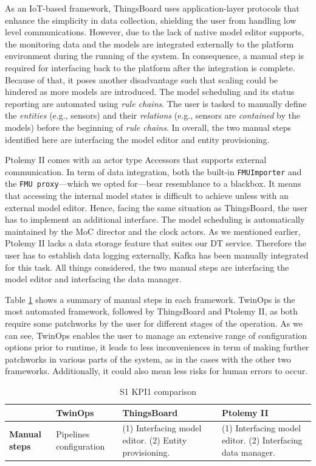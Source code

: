 As an IoT-based framework, ThingsBoard uses application-layer protocols that enhance the simplicity in data collection, shielding the user from handling low level communications. However, due to the lack of native model editor supports, the monitoring data and the models are integrated externally to the platform environment during the running of the system. In consequence, a manual step is required for interfacing back to the platform after the integration is complete. Because of that, it poses another disadvantage such that scaling could be hindered as more models are introduced. The model scheduling and its status reporting are automated using \textit{rule chains}. The user is tasked to manually define the \textit{entities} (e.g., sensors) and their \textit{relations} (e.g., sensors are \textit{contained} by the models) before the beginning of \textit{rule chains}. In overall, the two manual steps identified here are interfacing the model editor and entity provisioning. 

Ptolemy II comes with an actor type Accessors that supports external communication. In term of data integration, both the built-in \texttt{FMUImporter} and the \texttt{FMU proxy}---which we opted for---bear resemblance to a blackbox. It means that accessing the internal model states is difficult to achieve unless with an external model editor. Hence, facing the same situation as ThingsBoard, the user has to implement an additional interface. The model scheduling is automatically maintained by the MoC director and the clock actors. As we mentioned earlier, Ptolemy II lacks a data storage feature that suites our DT service. Therefore the user has to establish data logging externally, Kafka has been manually integrated for this task. All things considered, the two manual steps are interfacing the model editor and interfacing the data manager.

Table \ref{tab:kpi1compare} shows a summary of manual steps in each framework. TwinOps is the most automated framework, followed by ThingsBoard and Ptolemy II, as both require some patchworks by the user for different stages of the operation. As we can see, TwinOps enables the user to manage an extensive range of configuration options prior to runtime, it leads to less inconveniences in term of making further patchworks in various parts of the system, as in the cases with the other two frameworks. Additionally, it could also mean less risks for human errors to occur.

\begin{table}[hbt!]
\centering
\begin{tabularx}{\textwidth}{|X|p{3.5cm}|p{3.5cm}|p{3.5cm}|}
\hline
\textbf{} & {TwinOps} & {ThingsBoard} & {Ptolemy II} \\ \hline           
\textbf{Manual steps} & Pipelines configuration & (1) Interfacing model editor. (2) Entity provisioning. & (1) Interfacing model editor. (2) Interfacing data manager. \\ \hline             
\end{tabularx}
\caption{S1 KPI1 comparison}
\label{tab:kpi1compare}
\end{table}

